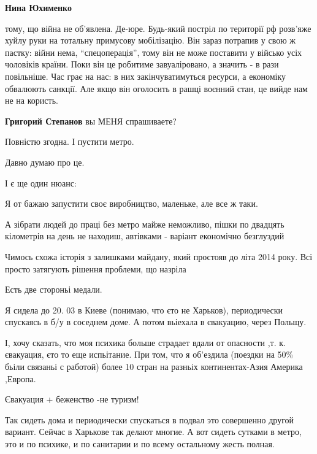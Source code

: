 \begin{itemize}
\begin{itemize}
\textbf{Нина Юхименко} 

тому, що війна не об'явлена. Де-юре. Будь-який постріл по території рф розв'яже
хуйлу руки на тотальну примусову мобілізацію. Він зараз потрапив у свою ж
пастку: війни нема, \enquote{спецоперація}, тому він не може поставити у військо усіх
чоловіків країни. Поки він це робитиме завуаліровано, а значить - в рази
повільніше. Час грає на нас: в них закінчуватимуться ресурси, а економіку
обвалюють санкції. Але якщо він оголосить в рашці воєнний стан, це вийде нам не
на користь.

\textbf{Григорий Степанов} вы МЕНЯ спрашиваете?

\end{itemize} %

Повністю згодна. І пустити метро.

Давно думаю про це.


І є ще один нюанс:

Я от бажаю запустити своє виробництво, маленьке, але все ж таки.

А зібрати людей до праці без метро майже неможливо, пішки по двадцять
кілометрів на день не находиш, автівками - варіант економічно безглуздий


Чимось схожа історія з залишками майдану, який простояв до літа 2014 року. Всі
просто затягують рішення проблеми, що назріла


Есть две стороньі медали.

Я сидела до 20. 03 в Киеве (понимаю, что єто не Харьков), периодически спускаясь в
б/у в соседнем доме. А потом вьіехала в євакуацию, через Польщу.

І, хочу сказать, что моя психика больше страдает вдали от опасности
,т. к. євакуация, єто то еще испьітание. При том, что я об'ездила (поездки на 50\%
бьіли связаньі с работой) более 10 стран на разньіх континентах-Азия Америка
,Европа.

Євакуация + беженство -не туризм!

\begin{itemize} %

Так сидеть дома и периодически спускаться в подвал это совершенно другой
вариант. Сейчас в Харькове так делают многие. А вот сидеть сутками в метро, это
и по психике, и по санитарии и по всему остальному жесть полная.


\end{itemize}
\end{itemize}
